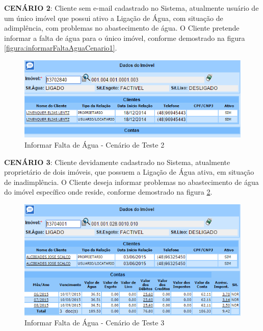 \begin{flushleft}
	\begin{description}
		\item \textbf{CENÁRIO 2}: Cliente sem e-mail cadastrado no Sistema, atualmente usuário de um único imóvel que possui ativo a Ligação de Água, com situação de adimplência, com problemas no abastecimento de água. O Cliente pretende informar a falta de água para o único imóvel, conforme demostrado na figura \ref{figura:informarFaltaAguaCenario1}.
		\begin{figure}[H]
			\centering
			\caption{Informar Falta de Água - Cenário de Teste 2}
			\label{figura:informarFaltaAguaCenario2}
			\includegraphics{figuras/cenarios/informar_falta_agua/cenario_2.PNG}
		\end{figure}		
	\end{description}
	
	\begin{description}
		\item \textbf{CENÁRIO 3}: Cliente devidamente cadastrado no Sistema, atualmente proprietário de dois imóveis, que possuem a Ligação de Água ativa, em situação de inadimplência. O Cliente deseja informar problemas no abastecimento de água do imóvel específico onde reside, conforme demostrado na figura \ref{figura:informarFaltaAguaCenario3}.
		\begin{figure}[H]
			\centering
			\caption{Informar Falta de Água - Cenário de Teste 3}
			\label{figura:informarFaltaAguaCenario3}
			\includegraphics{figuras/cenarios/informar_falta_agua/cenario_3.PNG}
			\legend {\fontsize{10}{12}\selectfont {Fonte: Autoria Própria}.}	
		\end{figure}
	\end{description}
\end{flushleft}	

